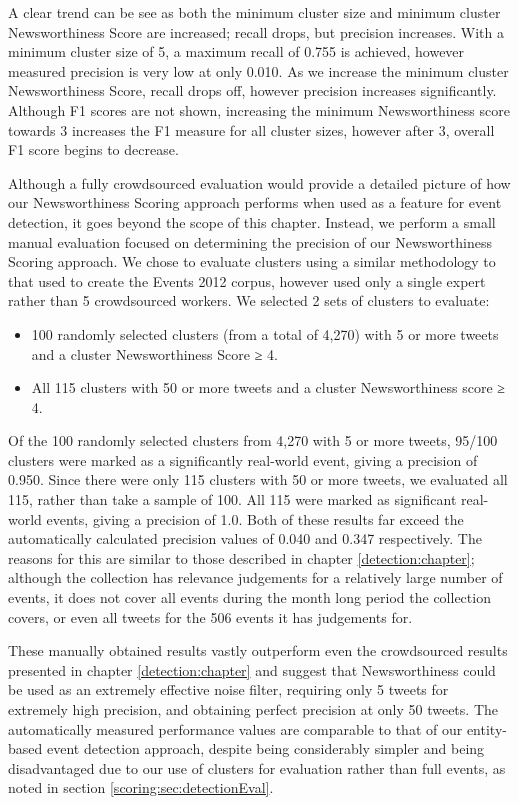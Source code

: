 A clear trend can be see as both the minimum cluster size and minimum cluster Newsworthiness Score are increased; recall drops, but precision increases. With a minimum cluster size of 5, a maximum recall of 0.755 is achieved, however measured precision is very low at only 0.010.
As we increase the minimum cluster Newsworthiness Score, recall drops off, however precision increases significantly.
Although F1 scores are not shown, increasing the minimum Newsworthiness score towards 3 increases the F1 measure for all cluster sizes, however after 3, overall F1 score begins to decrease.

Although a fully crowdsourced evaluation would provide a detailed picture of how our Newsworthiness Scoring approach performs when used as a feature for event detection, it goes beyond the scope of this chapter.
Instead, we perform a small manual evaluation focused on determining the precision of our Newsworthiness Scoring approach.
We chose to evaluate clusters using a similar methodology to that used to create the Events 2012 corpus, however used only a single expert rather than 5 crowdsourced workers.
We selected 2 sets of clusters to evaluate:
\begin{itemize}
	\item 100 randomly selected clusters (from a total of 4,270) with 5 or more tweets and a cluster Newsworthiness Score ≥ 4.
	\item All 115 clusters with 50 or more tweets and a cluster Newsworthiness score ≥ 4.
\end{itemize}

Of the 100 randomly selected clusters from 4,270 with 5 or more tweets, 95/100 clusters were marked as a significantly real-world event, giving a precision of 0.950.
Since there were only 115 clusters with 50 or more tweets, we evaluated all 115, rather than take a sample of 100. All 115 were marked as significant real-world events, giving a precision of 1.0.
Both of these results far exceed the automatically calculated precision values of 0.040 and 0.347 respectively.
The reasons for this are similar to those described in chapter \ref{detection:chapter}; although the collection has relevance judgements for a relatively large number of events, it does not cover all events during the month long period the collection covers, or even all tweets for the 506 events it has judgements for.

These manually obtained results vastly outperform even the crowdsourced results presented in chapter \ref{detection:chapter} and suggest that Newsworthiness could be used as an extremely effective noise filter, requiring only 5 tweets for extremely high precision, and obtaining perfect precision at only 50 tweets.
The automatically measured performance values are comparable to that of our entity-based event detection approach, despite being considerably simpler and being disadvantaged due to our use of clusters for evaluation rather than full events, as noted in section \ref{scoring:sec:detectionEval}.